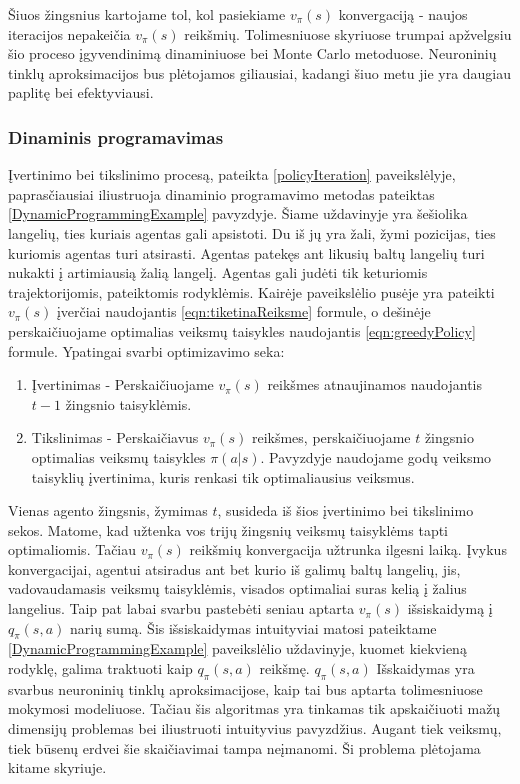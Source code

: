 \documentclass[a4paper, 12pt]{article}
\begin{document}
Šiuos žingsnius kartojame tol, kol pasiekiame $v_{\pi}(s)$ konvergaciją - naujos iteracijos nepakeičia $v_{\pi}(s)$ reikšmių. Tolimesniuose skyriuose trumpai apžvelgsiu šio proceso įgyvendinimą dinaminiuose bei Monte Carlo metoduose. Neuroninių tinklų aproksimacijos bus plėtojamos giliausiai, kadangi šiuo metu jie yra daugiau paplitę bei efektyviausi.

\subsubsection{Dinaminis programavimas}

Įvertinimo bei tikslinimo procesą, pateikta \ref{policyIteration} paveikslėlyje, paprasčiausiai iliustruoja dinaminio programavimo metodas pateiktas \ref{DynamicProgrammingExample} pavyzdyje. Šiame uždavinyje yra šešiolika langelių, ties kuriais agentas gali apsistoti. Du iš jų yra žali, žymi pozicijas, ties kuriomis agentas turi atsirasti. Agentas patekęs ant likusių baltų langelių turi nukakti į artimiausią žalią langelį. Agentas gali judėti tik keturiomis trajektorijomis, pateiktomis rodyklėmis. Kairėje paveikslėlio pusėje yra pateikti $v_{\pi}(s)$ įverčiai naudojantis \ref{eqn:tiketinaReiksme} formule, o dešinėje perskaičiuojame optimalias veiksmų taisykles naudojantis \ref{eqn:greedyPolicy} formule. Ypatingai svarbi optimizavimo seka:

\begin{enumerate}
  \addtolength{\itemsep}{-0.5\baselineskip} 
  \item Įvertinimas - Perskaičiuojame $v_{\pi}(s)$ reikšmes atnaujinamos naudojantis $t-1$ žingsnio taisyklėmis.
  \item Tikslinimas - Perskaičiavus $v_{\pi}(s)$ reikšmes, perskaičiuojame $t$ žingsnio optimalias veiksmų taisykles $\pi(a|s)$. Pavyzdyje naudojame godų veiksmo taisyklių įvertinima, kuris renkasi tik optimaliausius veiksmus.
\end{enumerate}

Vienas agento žingsnis, žymimas $t$, susideda iš šios įvertinimo bei tikslinimo sekos. Matome, kad užtenka vos trijų žingsnių veiksmų taisyklėms tapti optimaliomis. Tačiau $v_{\pi}(s)$ reikšmių konvergacija užtrunka ilgesni laiką. Įvykus konvergacijai, agentui atsiradus ant bet kurio iš galimų baltų langelių, jis, vadovaudamasis veiksmų taisyklėmis, visados optimaliai suras kelią į žalius langelius. Taip pat labai svarbu pastebėti seniau aptarta $v_{\pi}(s)$ išsiskaidymą į $q_{\pi}(s, a)$ narių sumą. Šis išsiskaidymas intuityviai matosi pateiktame \ref{DynamicProgrammingExample} paveikslėlio uždavinyje, kuomet kiekvieną rodyklę, galima traktuoti kaip $q_{\pi}(s, a)$ reikšmę.
$q_{\pi}(s, a)$ Išskaidymas yra svarbus neuroninių tinklų aproksimacijose, kaip tai bus aptarta tolimesniuose mokymosi modeliuose. Tačiau šis algoritmas yra tinkamas tik apskaičiuoti mažų dimensijų problemas bei iliustruoti intuityvius pavyzdžius. Augant tiek veiksmų, tiek būsenų erdvei šie skaičiavimai tampa neįmanomi. Ši problema plėtojama kitame skyriuje.
\end{document}
